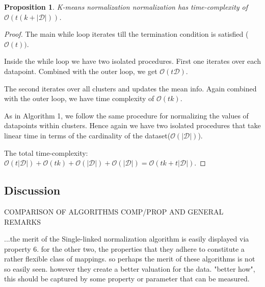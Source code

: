 \documentclass{article}
\newtheorem{proposition}{Proposition}
\newcommand{\dataset}{\mathcal{D}}   %
\begin{document}
\begin{proposition}
K-means normalization normalization has time-complexity of  $\mathcal{O}(t(k+|\dataset|))$.
\end{proposition}

\begin{proof}
The main while loop iterates till the termination condition is satisfied ($\mathcal{O}(t))$.

Inside the while loop we have two isolated procedures. First one iterates over each datapoint. Combined with the outer loop, we get $\mathcal{O}(t\dataset)$.

The second iterates over all clusters and updates the mean info. Again combined with the outer loop, we have time complexity of  $\mathcal{O}(tk)$.

As in Algorithm 1, we follow the same procedure for normalizing the values of datapoints within clusters. Hence again we have two isolated procedures that take linear time in terms of the cardinality of the dataset($\mathcal{O}(|\dataset|)$).

The total time-complexity:  $\mathcal{O}(t|\dataset|)  + \mathcal{O}(tk)  + \mathcal{O}(|\dataset|) + \mathcal{O}(|\dataset|) =  \mathcal{O}(tk+t|\dataset|)$.

\end{proof}



\subsection{Discussion}

COMPARISON OF ALGORITHMS COMP/PROP AND GENERAL REMARKS

...the merit of the Single-linked normalization algorithm is easily displayed via property 6. for the other two, the properties that they adhere to constitute a rather flexible class of mappings. so perhaps the merit of these algorithms is not so easily seen. however they create a better valuation for the data. "better how", this should be captured by some property or parameter that can be measured. 
\end{document}
